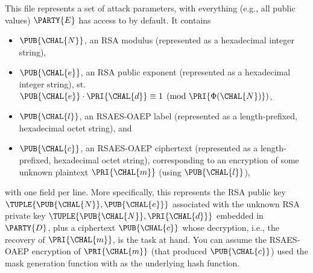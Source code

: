 \documentclass[crop={false},multi={true},tikz={true}]{standalone}
\begin{document}

This file represents a set of attack parameters, with everything (e.g.,
all public values) $\PARTY{E}$ has access to by default.  It contains 

\begin{itemize}
\item $\PUB{\CHAL{N}}$,     
      an RSA        modulus
      (represented as a                   hexadecimal integer string),
\item $\PUB{\CHAL{e}}$,
      an RSA        public exponent
      (represented as a                   hexadecimal integer string),
      st. $\PUB{\CHAL{e}} \cdot \PRI{\CHAL{d}} \equiv 1 \pmod{\PRI{\Phi{(\CHAL{N})}}}$,
\item $\PUB{\CHAL{l}}$,
      an RSAES-OAEP label
      (represented as a  length-prefixed, hexadecimal octet   string),
      and
\item $\PUB{\CHAL{c}}$,
      an RSAES-OAEP ciphertext 
      (represented as a  length-prefixed, hexadecimal octet   string),
      corresponding to an encryption of some unknown plaintext 
      $\PRI{\CHAL{m}}$ (using $\PUB{\CHAL{l}}$),
\end{itemize}

\noindent
with one field per line.
More specifically, this represents the RSA public key 
$
\TUPLE{ \PUB{\CHAL{N}}, \PUB{\CHAL{e}} }
$
associated with the unknown RSA private key 
$
\TUPLE{ \PUB{\CHAL{N}}, \PRI{\CHAL{d}} } 
$
embedded in $\PARTY{D}$, 
plus a ciphertext $\PUB{\CHAL{c}}$ whose decryption, i.e., the recovery 
of $\PRI{\CHAL{m}}$, is the task at hand.  You can assume the RSAES-OAEP 
encryption of $\PRI{\CHAL{m}}$ (that produced $\PUB{\CHAL{c}}$) used the
 mask generation function with 
 as the underlying hash function.
%
\end{document}
